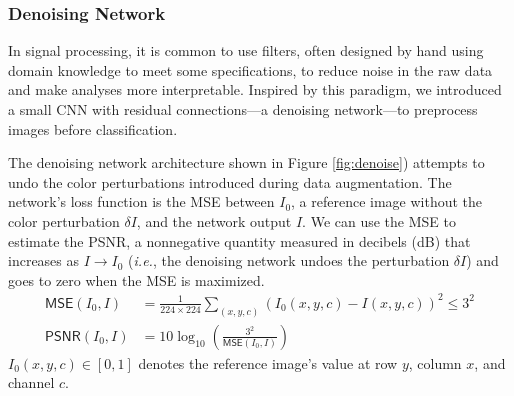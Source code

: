 \documentclass[justified]{article}
\begin{document}
  \subsubsection{Denoising Network}

  In signal processing, it is common to use filters, often designed by hand using domain knowledge to meet some specifications, to reduce noise in the raw data and make analyses more interpretable.
  Inspired by this paradigm, we introduced a small CNN with residual connections---a denoising network---to preprocess images before classification.

  The denoising network architecture shown in Figure \ref{fig:denoise}) attempts to undo the color perturbations introduced during data augmentation.
  The network's loss function is the MSE between $I_0$, a reference image without the color perturbation $\delta I$, and the network output $I$.
  We can use the MSE to estimate the PSNR, a nonnegative quantity measured in decibels (dB) that increases as $I \to I_0$ (\textit{i.e.}, the denoising network undoes the perturbation $\delta I$) and goes to zero when the MSE is maximized.
  \begin{equation}
    \begin{split}
      \mathsf{MSE}(I_0, I) &= \frac{1}{224 \times 224} \sum_{(x, y, c)} \left(I_0(x, y, c) - I(x, y, c)\right)^2 \leq 3^2 \\
      \mathsf{PSNR}(I_0, I) &= 10 \log_{10} \left(\frac{3^2}{\mathsf{MSE}(I_0, I)}\right)
    \end{split}
  \end{equation}
  $I_0(x, y, c) \in [0, 1]$ denotes the reference image's value at row $y$, column $x$, and channel $c$.
\end{document}
